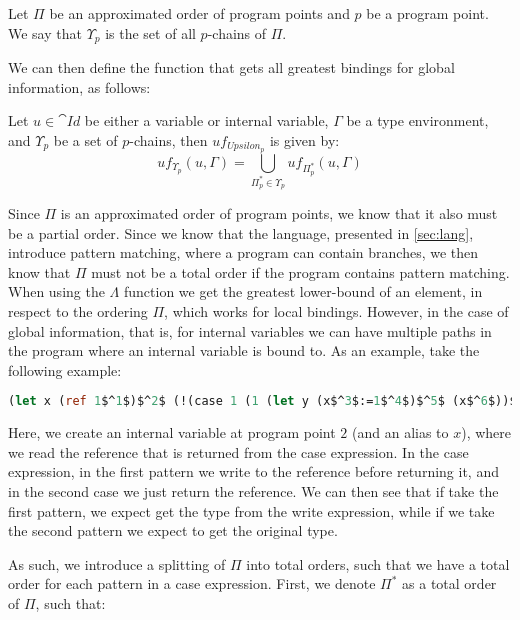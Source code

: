\documentclass[../../master.tex]{subfiles}
\begin{document}
\begin{definition}[$\Upsilon$]
	Let $\Pi$ be an approximated order of program points and $p$ be a program point.
	We say that $\Upsilon_p$ is the set of all $p$-chains of $\Pi$.
\end{definition}

We can then define the function that gets all greatest bindings for global information, as follows:

\begin{definition}
	Let $u\in \cat{Id}$ be either a variable or internal variable, $\Gamma$ be a type environment, and $\Upsilon_p$ be a set of $p$-chains, then $uf_{Upsilon_p}$ is given by:
	$$uf_{\Upsilon_p}(u,\Gamma)=\bigcup_{\Pi_p^{*}\in\Upsilon_p}uf_{\Pi_p^{*}}(u,\Gamma)$$
\end{definition}

\iffalse
Since $\Pi$ is an approximated order of program points, we know that it also must be a partial order.
Since we know that the language, presented in \cref{sec:lang}, introduce pattern matching, where a program can contain branches, we then know that $\Pi$ must not be a total order if the program contains pattern matching.
When using the $\Lambda$ function we get the greatest lower-bound of an element, in respect to the ordering $\Pi$, which works for local bindings.
However, in the case of global information, that is, for internal variables we can have multiple paths in the program where an internal variable is bound to.
As an example, take the following example:

\begin{lstlisting}[language=Caml, mathescape=true]
(let x (ref 1$^1$)$^2$ (!(case 1 (1 (let y (x$^3$:=1$^4$)$^5$ (x$^6$))$^7$) (2 (x$^8$))$^{9}$)$^{10}$))$^{11}$
\end{lstlisting}
Here, we create an internal variable at program point $2$ (and an alias to $x$), where we read the reference that is returned from the case expression.
In the case expression, in the first pattern we write to the reference before returning it, and in the second case we just return the reference.
We can then see that if take the first pattern, we expect get the type from the write expression, while if we take the second pattern we expect to get the original type.

As such, we introduce a splitting of $\Pi$ into total orders, such that we have a total order for each pattern in a case expression.
First, we denote $\Pi^{*}$ as a total order of $\Pi$, such that:
\end{document}
